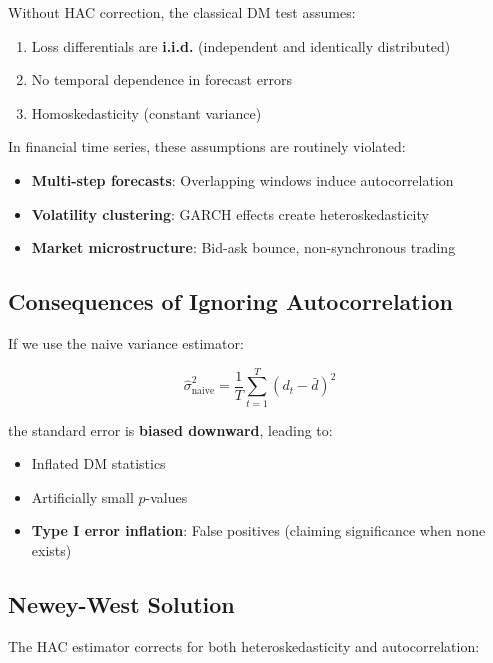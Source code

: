 \documentclass[11pt,a4paper]{article}
\begin{document}
Without HAC correction, the classical DM test assumes:

\begin{enumerate}
    \item Loss differentials are \textbf{i.i.d.} (independent and identically distributed)
    \item No temporal dependence in forecast errors
    \item Homoskedasticity (constant variance)
\end{enumerate}

In financial time series, these assumptions are routinely violated:

\begin{itemize}
    \item \textbf{Multi-step forecasts}: Overlapping windows induce autocorrelation
    \item \textbf{Volatility clustering}: GARCH effects create heteroskedasticity
    \item \textbf{Market microstructure}: Bid-ask bounce, non-synchronous trading
\end{itemize}

\subsection{Consequences of Ignoring Autocorrelation}

If we use the naive variance estimator:

\begin{equation}
\hat{\sigma}^2_{\text{naive}} = \frac{1}{T} \sum_{t=1}^{T} (d_t - \bar{d})^2
\end{equation}

the standard error is \textbf{biased downward}, leading to:

\begin{itemize}
    \item Inflated DM statistics
    \item Artificially small $p$-values
    \item \textbf{Type I error inflation}: False positives (claiming significance when none exists)
\end{itemize}

\subsection{Newey-West Solution}

The HAC estimator corrects for both heteroskedasticity and autocorrelation:
\end{document}
